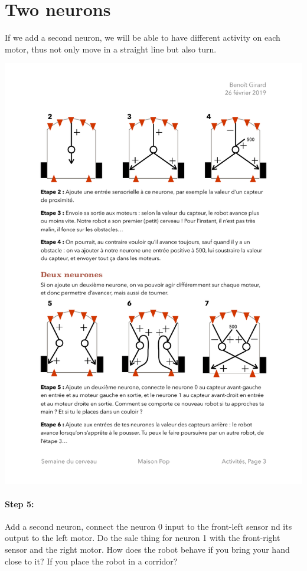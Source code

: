 \documentclass[12pt]{article}
\begin{document}
\section{Two neurons}

If we add a second neuron, we will be able to have different activity on each motor, thus not only move in a straight line but also turn.

\includegraphics{../Etapes5-7.pdf}

\paragraph{Step 5:} Add a second neuron, connect the neuron 0 input to the front-left sensor nd its output to the left motor. Do the sale thing for neuron 1 with the front-right sensor and the right motor. How does the robot behave if you bring your hand close to it? If you place the robot in a corridor?
\end{document}
